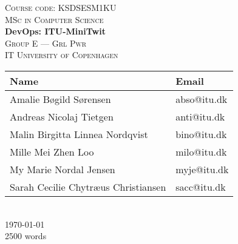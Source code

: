 \newcommand{\HRule}{\rule{1.25\linewidth}{0.5mm}}
\center
\vspace*{-4.35cm}
%
\vspace{3cm}
\textsc{\large Course code: KSDSESM1KU}
\\[0.2cm]
\textsc{\large MSc in Computer Science}
\\[0.5cm]
\hbox{\makebox[1\textwidth][c]{\HRule}}
\vspace{0.4cm}
{ \huge \bfseries DevOps: ITU-MiniTwit}
\\[0.6cm]
\hbox{\makebox[1\textwidth][c]{\HRule}}
\vspace{0.9cm}
\textsc{\Large Group E --- Grl Pwr\\[0.5cm]IT University of Copenhagen}\\[1.5cm]
\begin{tabular}{ll}
\toprule
\textbf{Name} & \textbf{Email} \\
\midrule
Amalie Bøgild Sørensen & abso@itu.dk \\
Andreas Nicolaj Tietgen & anti@itu.dk \\
Malin Birgitta Linnea Nordqvist & bino@itu.dk \\
Mille Mei Zhen Loo & milo@itu.dk \\
My Marie Nordal Jensen & myje@itu.dk \\
Sarah Cecilie Chytræus Christiansen & sacc@itu.dk \\

\bottomrule
\end{tabular}
\\[2cm]
{\large \today}
\\[1.5cm]
{\large 2500 words}
\vfill
